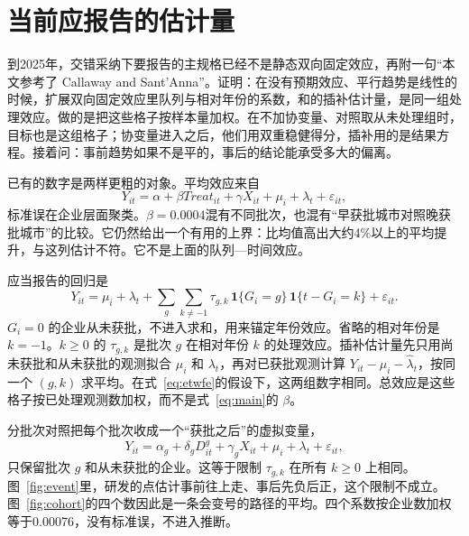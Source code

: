 \documentclass[12pt,hyperref,a4paper,UTF8]{ctexart}
\begin{document}
\section{当前应报告的估计量}

到2025年，交错采纳下要报告的主规格已经不是静态双向固定效应，再附一句“本文参考了 Callaway and Sant'Anna”。\textcite{wooldridge2025mundlak}证明：在没有预期效应、平行趋势是线性的时候，扩展双向固定效应里队列与相对年份的系数，和\textcite{borusyak2024revisiting}的插补估计量，是同一组处理效应。\textcite{sun2021estimating}做的是把这些格子按样本量加权。\textcite{callaway2021difference}在不加协变量、对照取从未处理组时，目标也是这组格子；协变量进入之后，他们用双重稳健得分，插补用的是结果方程。\textcite{rambachan2023credible}接着问：事前趋势如果不是平的，事后的结论能承受多大的偏离。

已有的数字是两样更粗的对象。平均效应来自
\begin{equation}
Y_{it}=\alpha+\beta Treat_{it}+\gamma X_{it}+\mu_i+\lambda_t+\varepsilon_{it},
\label{eq:main}
\end{equation}
标准误在企业层面聚类。$\beta=0.0004$混有不同批次，也混有“早获批城市对照晚获批城市”的比较。它仍然给出一个有用的上界：比均值高出大约4\%以上的平均提升，与这列估计不符。它不是上面的队列—时间效应。

应当报告的回归是
\begin{equation}
Y_{it}=\mu_i+\lambda_t+\sum_{g}\sum_{k\neq -1}\tau_{g,k}\,\mathbf{1}\{G_i=g\}\,\mathbf{1}\{t-G_i=k\}+\varepsilon_{it}.
\label{eq:etwfe}
\end{equation}
$G_i=0$ 的企业从未获批，不进入求和，用来锚定年份效应。省略的相对年份是 $k=-1$。$k\ge 0$ 的 $\tau_{g,k}$ 是批次 $g$ 在相对年份 $k$ 的处理效应。插补估计量先只用尚未获批和从未获批的观测拟合 $\mu_i$ 和 $\lambda_t$，再对已获批观测计算 $Y_{it}-\hat\mu_i-\hat\lambda_t$，按同一个 $(g,k)$ 求平均。在式~\eqref{eq:etwfe}的假设下，这两组数字相同。总效应是这些格子按已处理观测数加权，而不是式~\eqref{eq:main}的 $\beta$。

分批次对照把每个批次收成一个“获批之后”的虚拟变量，
\begin{equation}
Y_{it}=\alpha_g+\delta_g D_{it}^{g}+\gamma_g X_{it}+\mu_i+\lambda_t+\varepsilon_{it},
\label{eq:cohort}
\end{equation}
只保留批次 $g$ 和从未获批的企业。这等于限制 $\tau_{g,k}$ 在所有 $k\ge 0$ 上相同。图~\ref{fig:event}里，研发的点估计事前往上走、事后先负后正，这个限制不成立。图~\ref{fig:cohort}的四个数因此是一条会变号的路径的平均。四个系数按企业数加权等于0.00076，没有标准误，不进入推断。
\end{document}
